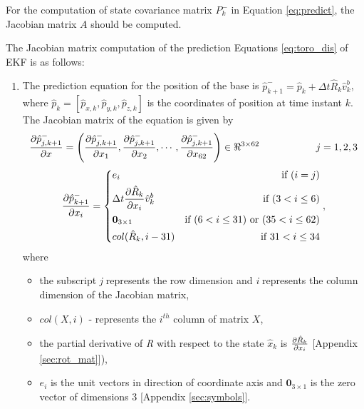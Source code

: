 For the computation of state covariance matrix $P_k^-$ in Equation \ref{eq:predict}, the Jacobian matrix $A$ should be computed. 

The Jacobian matrix computation of the prediction Equations \ref{eq:toro_dis} of EKF is as follows:
\begin{enumerate}
\item The prediction equation for the position of the base is $ \hat{p}_{k+1}^- = \hat{p}_k + \Delta t \hat R_k \hat v^b_k$, where  $ \hat{p}_k = [\hat{p}_{x,k},\hat{p}_{y,k},\hat{p}_{z,k}]$ is the coordinates of position at time instant $k$. The Jacobian matrix of the equation is given by
\begin{equation}
\label{eq:dpdx}
\frac{\partial {\hat{p}_{j,k+1}^-}}{\partial {x}} = \left(\frac{\partial {\hat{p}_{j,k+1}^-}}{\partial {x_{1}}}, \frac{\partial {\hat{p}_{j,k+1}^-}}{\partial {x_{2}}}, \cdots , \frac{\partial {\hat{p}_{j,k+1}^-}}{\partial {x_{62}}}\right) \in \Re^{3 \times 62} \hspace{2cm} j=1,2,3
\end{equation}
\[
 \frac{\partial {\hat{p}_{k+1}^-}}{\partial {x_{i}}} =  \left\lbrace
  \!\begin{aligned}
   &e_i & \text{if }(i=j)\\
   &\Delta t \frac{\partial {\hat R_k}}{\partial {x_i}} \hat v^b_k & \text{if }(3 < i \leq 6)\\
   &\textbf{0}_{3 \times 1} &\text{if }(6 < i \leq 31) \text{ or } (35 < i \leq 62) \\
   &col(\hat R_k,i-31) & \text{if } 31 < i \leq 34 \\
  \end{aligned} \right. ,
\]where
\begin{itemize}
\item the subscript \emph{j} represents the row dimension and \emph{i} represents the column dimension of the Jacobian matrix,
\item $col(X,i)$ - represents the $i^{th}$ column of matrix $X$,
\item the partial derivative of \emph{R} with respect to the state $\hat{x}_k$ is $\frac{\partial {\hat R_k}}{\partial {x_i}}$ [Appendix \ref{sec:rot_mat}]),
\item  $e_i$ is the unit vectors in direction of coordinate axis and  $\textbf{0}_{3 \times 1}$ is the zero vector of dimensions 3 [Appendix \ref{sec:symbols}].
\end{itemize}


\end{enumerate}
